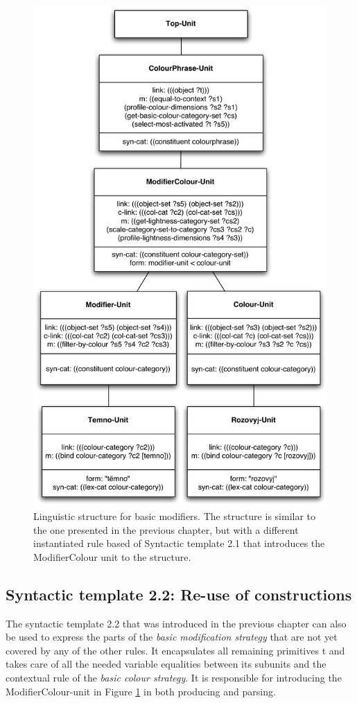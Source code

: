 \begin{figure}[htbp]
  \centering
  \includegraphics[width=.8\textwidth]{./achromatic/figures/linguistic-structure.pdf}
  \caption[Linguistic structure for basic modifiers]{Linguistic
    structure for basic modifiers. The structure is similar to the
    one presented in the previous chapter, but with a different
    instantiated rule based of Syntactic template 2.1 that introduces
    the ModifierColour unit to the structure.}
  \label{f:ams-linguistic-structure}
\end{figure}

\subsection{Syntactic template 2.2: Re-use of constructions}

The syntactic template 2.2 that was introduced in the previous chapter
can also be used to express the parts of the \emph{basic
  modification strategy} that are not yet covered by any of the other
rules. It encapsulates all remaining primitives t and takes care of
all the needed variable equalities between its subunits and the
contextual rule of the \emph{basic colour strategy}. It is responsible for
introducing the ModifierColour-unit in Figure
\ref{f:ams-linguistic-structure} in both producing and parsing.

